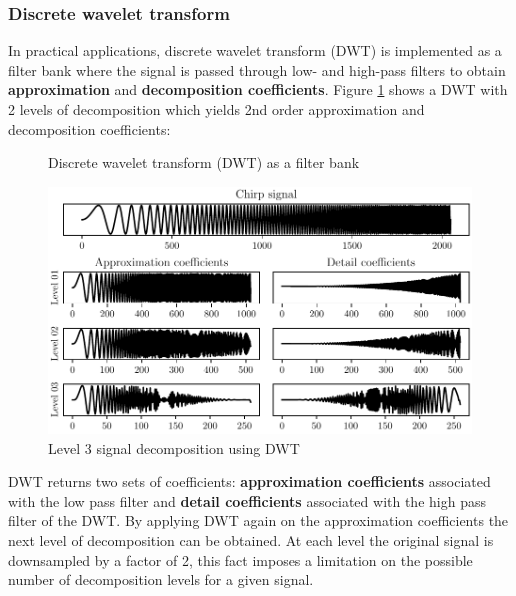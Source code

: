 \subsubsection{Discrete wavelet transform}%
\label{subsub:discrete_wavelet_transform}
In practical applications, discrete wavelet transform (DWT) is implemented as a filter bank where the signal is passed through low- and high-pass filters to obtain \textbf{approximation} and \textbf{decomposition coefficients}. Figure \ref{fig:dwt} shows a DWT with 2 levels of decomposition which yields 2nd order approximation and decomposition coefficients:

\begin{figure}[H]
    \centering
    
    \caption{Discrete wavelet transform (DWT) as a filter bank}
    \label{fig:dwt}
\end{figure}

\begin{figure}[H]
    \centering
    \includegraphics{figures/dwt_chirp.pdf}
    \caption{Level 3 signal decomposition using DWT}
    \label{fig:dwt-chirp-signal}
\end{figure}

DWT returns two sets of coefficients: \textbf{approximation coefficients} associated with the low pass filter and \textbf{detail coefficients} associated with the high pass filter of the DWT. By applying DWT again on the approximation coefficients the next level of decomposition can be obtained. At each level the original signal is downsampled by a factor of 2, this fact imposes a limitation on the possible number of decomposition levels for a given signal.


